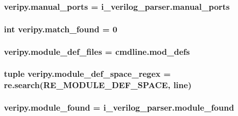 \hypertarget{namespaceveripy_a9a896686fd9fe466ad77dc1090ca93aa}{
\subsubsection[{manual\-\_\-ports}]{\setlength{\rightskip}{0pt plus 5cm}veripy.\-manual\-\_\-ports = i\-\_\-verilog\-\_\-parser.\-manual\-\_\-ports}}\label{namespaceveripy_a9a896686fd9fe466ad77dc1090ca93aa}
\hypertarget{namespaceveripy_a36080b835363b2f49375da1d2031699d}{
\subsubsection[{match\-\_\-found}]{\setlength{\rightskip}{0pt plus 5cm}int veripy.\-match\-\_\-found = 0}}\label{namespaceveripy_a36080b835363b2f49375da1d2031699d}
\hypertarget{namespaceveripy_ab56a15afcf8acd3e32e33fbb4cea7765}{
\subsubsection[{module\-\_\-def\-\_\-files}]{\setlength{\rightskip}{0pt plus 5cm}veripy.\-module\-\_\-def\-\_\-files = cmdline.\-mod\-\_\-defs}}\label{namespaceveripy_ab56a15afcf8acd3e32e33fbb4cea7765}
\hypertarget{namespaceveripy_a854da7683905a3b5cbf73256a6be33b4}{
\subsubsection[{module\-\_\-def\-\_\-space\-\_\-regex}]{\setlength{\rightskip}{0pt plus 5cm}tuple veripy.\-module\-\_\-def\-\_\-space\-\_\-regex = re.\-search(R\-E\-\_\-\-M\-O\-D\-U\-L\-E\-\_\-\-D\-E\-F\-\_\-\-S\-P\-A\-C\-E, {\bf line})}}\label{namespaceveripy_a854da7683905a3b5cbf73256a6be33b4}
\hypertarget{namespaceveripy_a99c42ac13d96eb9d80f354e2a1e05c56}{
\subsubsection[{module\-\_\-found}]{\setlength{\rightskip}{0pt plus 5cm}veripy.\-module\-\_\-found = i\-\_\-verilog\-\_\-parser.\-module\-\_\-found}}\label{namespaceveripy_a99c42ac13d96eb9d80f354e2a1e05c56}
